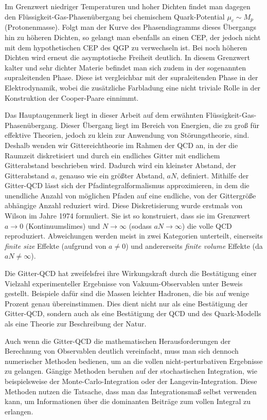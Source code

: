 {Im Grenzwert niedriger Temperaturen und hoher Dichten findet man dagegen den
Flüssigkeit-Gas-Phasenübergang bei chemischem Quark-Po\-ten\-ti\-al $\mu_c \sim
M_p$ (Protonenmasse). Folgt man der Kurve des Phasendiagramms dieses Übergangs
hin zu höheren Dichten, so gelangt man ebenfalls an einen CEP, der jedoch nicht
mit dem hypothetischen CEP des QGP zu verwechseln ist. Bei noch höheren Dichten
wird erneut die asymptotische Freiheit deutlich. In diesem Grenzwert kalter und
sehr dichter Materie befindet man sich zudem in der sogenannten supraleitenden
Phase. Diese ist vergleichbar mit der supraleitenden Phase in der
Elektrodynamik, wobei die zusätzliche Farbladung eine nicht triviale Rolle in
der Konstruktion der Cooper-Paare einnimmt.

Das Hauptaugenmerk liegt in dieser Arbeit auf dem erwähnten
Flüssigkeit-Gas-\-Pha\-sen\-über\-gang. Dieser Übergang liegt im Bereich von Energien,
die zu groß für effektive Theorien, jedoch zu klein zur Anwendung von
Stö\-rungs\-theo\-rie, sind. Deshalb wenden wir Gittereichtheorie im Rahmen der
QCD an, in der die Raumzeit diskretisiert und durch ein endliches Gitter mit
endlichem Gitterabstand beschrieben wird. Dadurch wird ein kleinster Abstand,
der Gitterabstand $a$, genauso wie ein größter Abstand, $a N$, definiert.
Mithilfe der Gitter-QCD lässt sich der Pfadintegralformalismus approximieren, in
dem die unendliche Anzahl von möglichen Pfaden auf eine endliche, von der
Gittergröße abhängige Anzahl reduziert wird. Diese Diskretisierung wurde
erstmals von Wilson im Jahre 1974 formuliert. Sie ist so konstruiert, dass sie
im Grenzwert $a \to 0$ (Kontinuumslimes) und $N \to \infty$ (sodass $a N \to
\infty$) die volle QCD reproduziert. Abweichungen werden meist in zwei
Kategorien unterteilt, einerseits \emph{finite size} Effekte (aufgrund von $a
\neq 0$) und andererseits \emph{finite volume} Effekte (da $a N \neq \infty$).

Die Gitter-QCD hat zweifelsfrei ihre Wirkungskraft durch die Bestätigung einer
Viel\-zahl experimenteller Ergebnisse von Vakuum-Observablen unter Beweis
gestellt. Bei\-spie\-le dafür sind die Massen leichter Hadronen, die bis auf wenige
Prozent genau übereinstimmen. Dies dient nicht nur als eine Bestätigung der
Gitter-QCD, sondern auch als eine Bestätigung der QCD und des Quark-Modells als
eine Theorie zur Beschreibung der Natur.

Auch wenn die Gitter-QCD die mathematischen Herausforderungen der Be\-rech\-nung
von Observablen deutlich vereinfacht, muss man sich dennoch numerischer Methoden
bedienen, um an die vollen nicht-perturbativen Ergebnisse zu gelangen. Gängige
Methoden beruhen auf der stochastischen Integration, wie beispielsweise der
Monte-Carlo-Integration oder der Langevin-Integration. Diese Methoden nutzen die
Tatsache, dass man das Integrationsmaß selbst verwenden kann, um Informationen
über die dominanten Beiträge zum vollen Integral zu erlangen.

}
